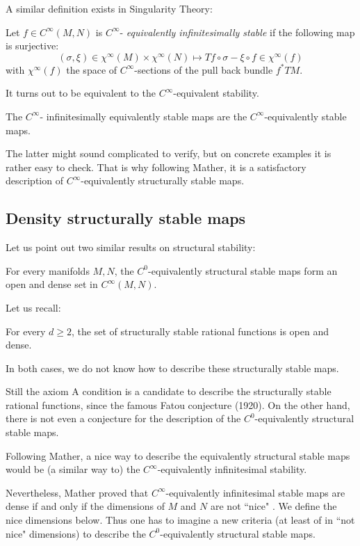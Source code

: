 \documentclass[11pt,openany,leqno]{article}
\begin{document}
A similar definition exists in Singularity Theory:
\begin{defi}
Let $f\in C^\infty(M,N)$ is $C^\infty$-\emph{ equivalently infinitesimally stable} if 
 the following map is surjective:
\[(\sigma, \xi)\in \chi^\infty(M)\times \chi^\infty(N)\mapsto Tf\circ \sigma- \xi\circ f\in \chi^\infty(f)\]
with $\chi^\infty(f)$ the space of $C^\infty$-sections of the pull back bundle  $f^*TM$. 
\end{defi}
It turns out to be equivalent to the $C^\infty$-equivalent stability.
\begin{thm}
The $C^\infty$-{ infinitesimally equivalently stable} maps are the $C^\infty$-equivalently stable maps.
\end{thm}
The latter might sound complicated to verify, but on concrete examples it is rather easy to check. That is why following Mather, it is a satisfactory description of $C^\infty$-equivalently structurally stable maps. 

 \subsection{Density structurally stable maps}

Let us point out two similar results on structural stability:
\begin{thm} \label{C0ESS}
For every manifolds $M,N$, the $C^0$-equivalently structural stable maps form an open and dense set in $C^\infty(M,N)$.
\end{thm}
Let us recall:
\begin{thm}
For every $d\ge 2$, the set of structurally stable rational functions is open and dense. 
\end{thm}
In both cases, we do not know  how to describe these structurally stable maps. 

Still the axiom A condition is a candidate to describe the structurally stable rational functions, since the famous Fatou conjecture (1920).  
On the other hand, there is not even a conjecture for the description of the  $C^0$-equivalently structural stable maps.
 
Following Mather, a nice way to describe the equivalently structural stable maps would be (a similar way to) the $C^\infty$-equivalently infinitesimal stability.

 Nevertheless,  Mather proved that $C^\infty$-equivalently infinitesimal stable maps  are  dense if and only if the dimensions of $M$ and $N$ are not ``nice" \cite{Ma670}. We define the nice dimensions below. Thus one has to imagine a new criteria (at least of in ``not nice" dimensions) to describe the $C^0$-equivalently structural stable maps. 
\end{document}
